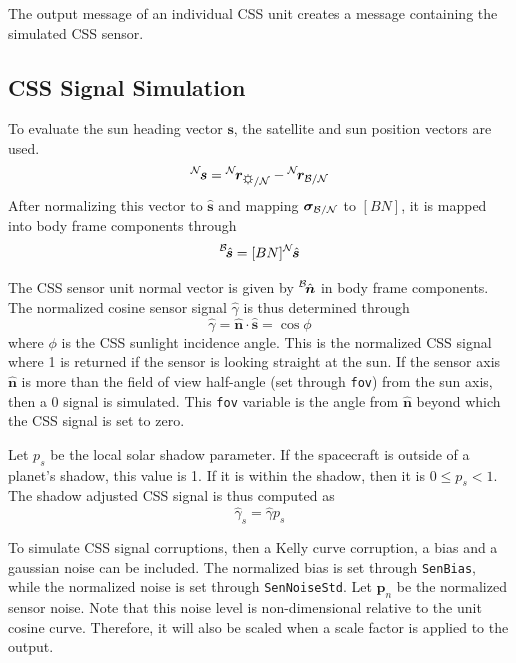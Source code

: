 The output message of an individual CSS unit creates a message containing the simulated CSS sensor.


\subsection{CSS Signal Simulation}
To evaluate the sun heading vector $\bm s$, the satellite and sun position vectors are used.
\begin{equation}
	\leftexp{N}{\bm s} = \leftexp{N}{\bm r}_{\sun/\mathcal{N}} - \leftexp{N}{\bm r}_{\cal B/N}
\end{equation}
After normalizing this vector to $\hat{\bm s}$ and mapping $\bm\sigma_{\cal B/N}$ to $[BN]$, it is mapped into body frame components through
\begin{equation}
	\leftexp{B}{\hat{\bm s}} = [BN] \leftexp{N}{\hat{\bm s}}
\end{equation}

The CSS sensor unit normal vector is given by $\leftexp{B}{\hat{\bm n}}$ in body frame components.  The normalized cosine sensor signal $\hat\gamma$ is thus determined through
\begin{equation}
	\hat \gamma = \hat{\bm n} \cdot \hat{\bm s} = \cos\phi
\end{equation}
where $\phi$ is the CSS sunlight incidence angle.  
This is the normalized CSS signal where 1 is returned if the sensor is looking straight at the sun.  If the sensor axis $\hat{\bm n}$ is more than the field of view half-angle (set through {\tt fov}) from the sun axis, then a 0 signal is simulated.  This {\tt fov} variable is the angle from $\hat{\bm n}$ beyond which the CSS signal is set to zero.  

Let $p_{s}$ be the local solar shadow parameter.  If the spacecraft is outside of a planet's shadow, this value is 1.  If it is within the shadow, then it is $0\le p_{s} < 1$.  The shadow adjusted CSS signal is thus computed as 
\begin{equation}
	\hat{\gamma}_{s} = \hat{\gamma} p_{s}
\end{equation}


To simulate CSS signal corruptions, then a Kelly curve corruption, a bias and a gaussian noise can be included.  The normalized bias is set through {\tt SenBias}, while the normalized noise is set through {\tt SenNoiseStd}.   Let $\bm p_{n}$ be the normalized sensor noise.  Note that this noise level is non-dimensional relative to the unit cosine curve.  Therefore, it will also be scaled when a scale factor is applied to the output.

